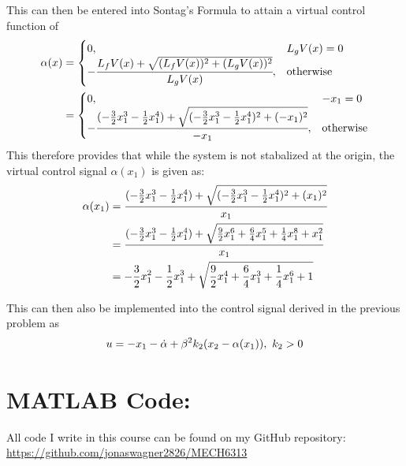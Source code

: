 \documentclass[letter]{article}
\begin{document}
This can then be entered into Sontag's Formula to attain a virtual control function of
\begin{align}
	\alpha(x) 
	&=
	\begin{cases}
		0,	& L_g V(x) = 0\\
		-\cfrac{L_f V(x) + \sqrt{(L_f V(x))^2 + (L_g V(x))^2}}{L_g V(x)}, &\text{otherwise}
	\end{cases}\\
	&=
	\begin{cases}
		0,	& - x_1 = 0\\
		-\cfrac{(-\frac{3}{2} x_1^3 - \frac{1}{2} x_1^4) + \sqrt{(-\frac{3}{2} x_1^3 - \frac{1}{2} x_1^4)^2 + (- x_1)^2}}{- x_1}, &\text{otherwise}
	\end{cases}
\end{align}
This therefore provides that while the system is not stabalized at the origin, the virtual control signal $\alpha(x_1)$ is given as:
\begin{align}
	\alpha(x_1) 
	&= \cfrac{(-\frac{3}{2} x_1^3 - \frac{1}{2} x_1^4) + \sqrt{(-\frac{3}{2} x_1^3 - \frac{1}{2} x_1^4)^2 + (x_1)^2}}{x_1}\\
	&= \cfrac{(-\frac{3}{2} x_1^3 - \frac{1}{2} x_1^4) + \sqrt{\frac{9}{2} x_1^6 + \frac{6}{4} x_1^5 + \frac{1}{4} x_1^8 + x_1^2}}{x_1}\\
	&= -\frac{3}{2} x_1^2 - \frac{1}{2} x_1^3 + \sqrt{\frac{9}{2} x_1^4 + \frac{6}{4} x_1^3 + \frac{1}{4} x_1^6 + 1}
\end{align}

This can then also be implemented into the control signal derived in the previous problem as
\begin{equation}
	u = -x_1 - \dot{\alpha} + \beta^2 k_2 \qty(x_2 - \alpha(x_1)), \ k_2 > 0
\end{equation}

\newpage
\appendix
\section{MATLAB Code:}\label{apx:matlab}
All code I write in this course can be found on my GitHub repository:\\
\href{https://github.com/jonaswagner2826/MECH6313}{https://github.com/jonaswagner2826/MECH6313}

\end{document}
